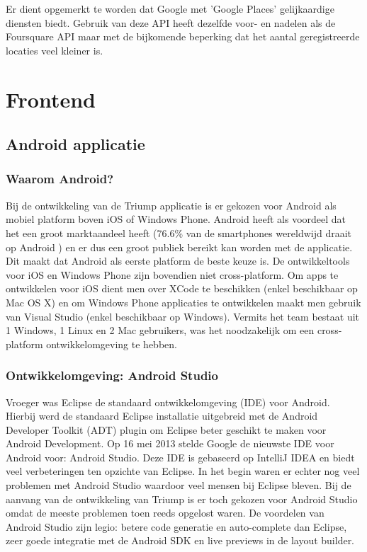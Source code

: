 Er dient opgemerkt te worden dat Google met 'Google Places' gelijkaardige diensten biedt. Gebruik van deze API heeft dezelfde voor- en nadelen als de Foursquare API maar met de bijkomende beperking dat het aantal geregistreerde locaties veel kleiner is.

\section{Frontend}
\subsection{Android applicatie}
\subsubsection{Waarom Android?}

Bij de ontwikkeling van de Triump applicatie is er gekozen voor Android als mobiel platform boven iOS of Windows Phone. Android heeft als voordeel dat het een groot marktaandeel heeft (76.6\% van de smartphones wereldwijd draait op Android \cite{marketshare}) en er dus een groot publiek bereikt kan worden met de applicatie. Dit maakt dat Android als eerste platform de beste keuze is. De ontwikkeltools voor iOS en Windows Phone zijn bovendien niet cross-platform. Om apps te ontwikkelen voor iOS dient men over XCode te beschikken (enkel beschikbaar op Mac OS X) en om Windows Phone applicaties te ontwikkelen maakt men gebruik van Visual Studio (enkel beschikbaar op Windows). Vermits het team bestaat uit 1 Windows, 1 Linux en 2 Mac gebruikers, was het noodzakelijk om een cross-platform ontwikkelomgeving te hebben.
\subsubsection{Ontwikkelomgeving: Android Studio}
Vroeger was Eclipse de standaard ontwikkelomgeving (IDE) voor Android. Hierbij werd de standaard Eclipse installatie uitgebreid met de Android Developer Toolkit (ADT) plugin om Eclipse beter geschikt te maken voor Android Development. Op 16 mei 2013 stelde Google de nieuwste IDE voor Android voor: Android Studio. Deze IDE is gebaseerd op IntelliJ IDEA en biedt veel verbeteringen ten opzichte van Eclipse. In het begin waren er echter nog veel problemen met Android Studio waardoor veel mensen bij Eclipse bleven. Bij de aanvang van de ontwikkeling van Triump is er toch gekozen voor Android Studio omdat de meeste problemen toen reeds opgelost waren.
De voordelen van Android Studio zijn legio: betere code generatie en auto-complete dan Eclipse, zeer goede integratie met de Android SDK en live previews in de layout builder. 

